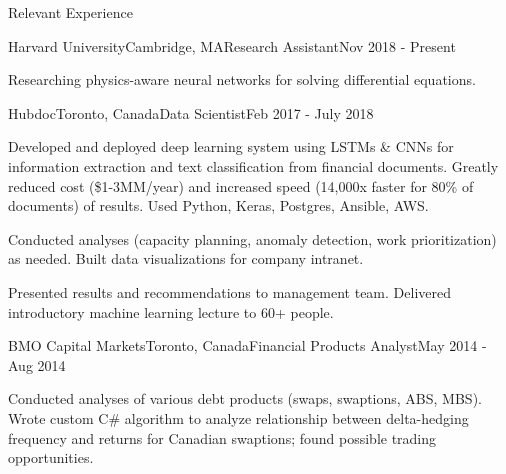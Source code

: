 \documentclass{resume} %
\begin{document}
\begin{rSection}{Relevant Experience}

\begin{rSubsection}{Harvard University}{Cambridge, MA}{Research Assistant}{Nov 2018 - Present}
\item Researching physics-aware neural networks for solving differential equations.
\end{rSubsection}


\begin{rSubsection}{Hubdoc}{Toronto, Canada}{Data Scientist}{Feb 2017 - July 2018}
\item Developed and deployed deep learning system using LSTMs \& CNNs for information extraction and text classification from financial documents. Greatly reduced cost (\$1-3MM/year) and increased speed (14,000x faster for 80\% of documents) of results. Used Python, Keras, Postgres, Ansible, AWS.
\item Conducted analyses (capacity planning, anomaly detection, work prioritization) as needed. Built data visualizations for company intranet.
\item Presented results and recommendations to management team. Delivered introductory machine learning lecture to 60+ people.
\end{rSubsection}


\begin{rSubsection}{BMO Capital Markets}{Toronto, Canada}{Financial Products Analyst}{May 2014 - Aug 2014}
\item Conducted analyses of various debt products (swaps, swaptions, ABS, MBS). Wrote custom C\# algorithm to analyze relationship between delta-hedging frequency and returns for Canadian swaptions; found possible trading opportunities.
\end{rSubsection}

\end{rSection}

\end{document}
